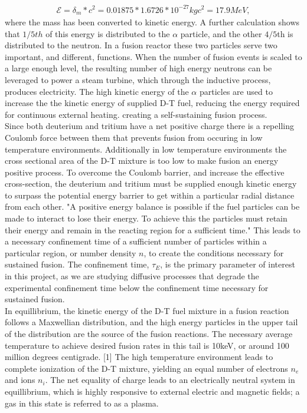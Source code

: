 \documentclass{article}
\begin{document}
\begin{align*}
\mathcal{E} = \delta_m *c^2 = 0.01875*1.6726*10^{-27}kg c^2 = 17.9 MeV,
\end{align*}
where the mass has been converted to kinetic energy.
A further calculation shows that $1/5th$ of this energy is distributed to the $\alpha$ particle, and the other $4/5$th is distributed to the neutron. In a fusion reactor these two particles serve two important, and different, functions. When the number of fusion events is scaled to a large enough level, the resulting number of high energy neutrons can be leveraged to power a steam turbine, which through the inductive process, produces electricity. The high kinetic energy of the $\alpha$ particles are used to increase the the kinetic energy of supplied D-T fuel, reducing the energy required for continuous external heating. creating a self-sustaining fusion process. \\
Since both deuterium and tritium have a net positive charge there is a repelling Coulomb force between them that prevents fusion from occuring in low temperature environments. Additionally in low temperature environments the cross sectional area of the D-T mixture is too low to make fusion an energy positive process. To overcome the Coulomb barrier, and increase the effective cross-section, the deuterium and tritium must be supplied enough kinetic energy to surpass the potential energy barrier to get within a particular radial distance from each other. "A positive energy balance is possible if the fuel particles can be made to interact to lose their energy. To achieve this the particles must retain their energy and remain in the reacting region for a sufficient time." This leads to a necessary confinement time of a sufficient number of particles within a particular region, or number density $n$, to create the conditions necessary for sustained fusion. The confinement time, $\tau_E$, is the primary parameter of interest in this project, as we are studying diffusive processes that degrade the experimental confinement time below the confinement time necessary for sustained fusion.\\
 In equillibrium, the kinetic energy of the D-T fuel mixture in a fusion reaction follows a Maxwellian distribution, and the high energy particles in the upper tail of the distribution are the source of the fusion reactions. The necessary average temperature to achieve desired fusion rates in this tail is 10keV, or around 100 million degrees centigrade. [1] The high temperature environment leads to complete ionization of the D-T mixture, yielding an equal number of electrons $n_e$ and ions $n_i$. The net equality of charge leads to an electrically neutral system in equillibrium, which is highly responsive to external electric and magnetic fields; a gas in this state is referred to as a plasma.\\
\end{document}
